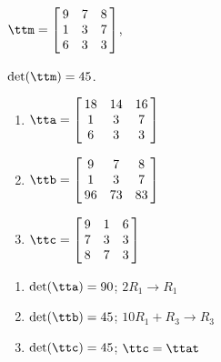 {$\ttm=\left[\hskip -3pt \begin{array}{ccc} 9&7&8\\  1&3&7
\\  6&3&3\end{array}\hskip -3pt \right] $,

 $\det(\ttm)=45$.
\begin{enumerate}
\item $\tta = \left[\hskip -3pt \begin{array}{ccc} 18&14&16\\  1&3&7
\\  6&3&3\end{array}\hskip -3pt \right]$
\item	$\ttb = \left[\hskip -3pt \begin{array}{ccc} 9&7&8\\  1&3&7
\\  96&73&83\end{array}\hskip -3pt \right]$
\item	$\ttc = \left[\hskip -3pt \begin{array}{ccc} 9&1&6\\  7&3&3
\\  8&7&3\end{array}\hskip -3pt \right] $
\end{enumerate}} 
{\begin{enumerate}
\item $\det(\tta) = 90$; $2R_1\rightarrow R_1$
\item $\det(\ttb) = 45$; $10R_1+R_3\rightarrow R_3$
\item $\det(\ttc) = 45$; $\ttc = \ttat$
\end{enumerate}}



  


